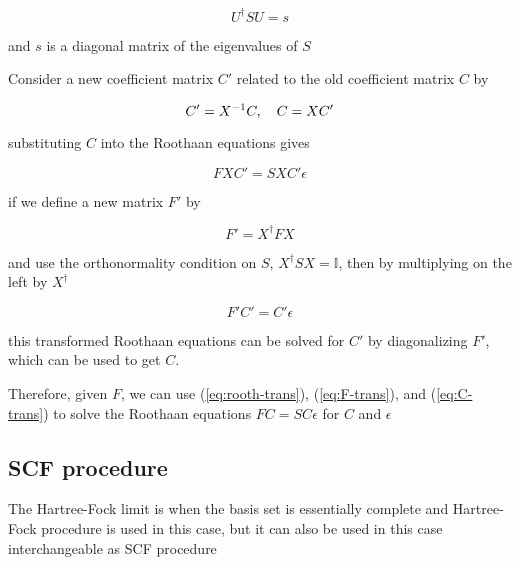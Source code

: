 \documentclass[11pt]{article}
\begin{document}
\[ U^{\dagger}SU=s \]

and \(s\) is a diagonal matrix of the eigenvalues of \(S\)

Consider a new coefficient matrix \(C'\) related to the old coefficient matrix \(C\) by

\begin{equation}
\label{eq:C-trans}
C' = X^{-1}C \qc C = X C'
\end{equation}

substituting \(C\) into the Roothaan equations gives

\[ F XC' = SXC' \epsilon \]

if we define a new matrix \(F'\) by

\begin{equation}
\label{eq:F-trans}
F' = X^{\dagger} FX
\end{equation}

and use the orthonormality condition on \(S\), \(X^{\dagger}SX=\mathbb{I}\), then by multiplying on the left by \(X^{\dagger}\)

\begin{equation}
\label{eq:rooth-trans}
F' C' = C' \epsilon
\end{equation}

this transformed Roothaan equations can be solved for \(C'\) by diagonalizing \(F'\), which can be used to get \(C\).

Therefore, given \(F\), we can use (\ref{eq:rooth-trans}), (\ref{eq:F-trans}), and (\ref{eq:C-trans}) to solve the Roothaan equations \(FC=SC\epsilon\) for \(C\) and \(\epsilon\)
\subsection{SCF procedure}
\label{sec:org8911117}

The Hartree-Fock limit is when the basis set is essentially complete and Hartree-Fock procedure is used in this case, but it can also be used in this case interchangeable as SCF procedure
\end{document}
